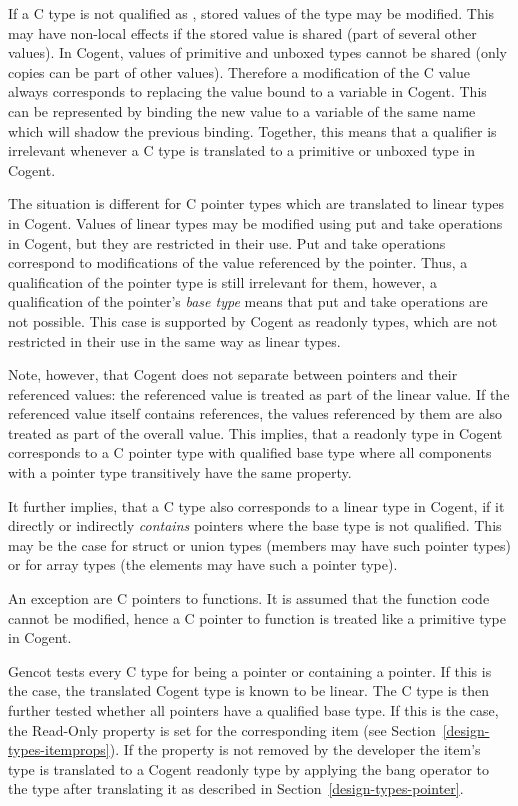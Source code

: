 If a C type is not qualified as , stored values of the type may be modified. This may have non-local
effects if the stored value is shared (part of several other values). In Cogent, values of primitive and unboxed types
cannot be shared (only copies can be part of other values). Therefore a modification of the C value always corresponds to
replacing the value bound to a variable in Cogent. This can be represented by binding the new value to a variable
of the same name which will shadow the previous binding. Together, this means that a  qualifier is
irrelevant whenever a C type is translated to a primitive or unboxed type in Cogent.

The situation is different for C pointer types which are translated to linear types in Cogent. Values of linear types
may be modified using put and take operations in Cogent, but they are restricted in their use. Put and take operations
correspond to modifications of the value referenced by the pointer. Thus, a  qualification of the pointer
type is still irrelevant for them, however, a  qualification of the pointer's \textit{base type} means
that put and take operations are not possible. This case is supported by Cogent as readonly types, which are not
restricted in their use in the same way as linear types.

Note, however, that Cogent does not separate between pointers and their referenced values: the referenced value
is treated as part of the linear value. If the referenced value itself contains references, the values referenced
by them are also treated as part of the overall value. This implies, that a readonly type in Cogent corresponds to
a C pointer type with  qualified base type where all components with a pointer type transitively have
the same property.

It further implies, that a C type also corresponds to a linear type in Cogent, if it directly or indirectly 
\textit{contains} pointers where the base type is not  qualified. This may be the case for struct or union
types (members may have such pointer types) or for array types (the elements may have such a pointer type).

An exception are C pointers to functions. It is assumed that the function code cannot be modified, hence a C pointer 
to function is treated like a primitive type in Cogent.

Gencot tests every C type for being a pointer or containing a pointer. If this is the case, the translated Cogent 
type is known to be linear. The C type is then further tested whether all pointers have a  qualified
base type. If this is the case, the Read-Only property is set for the corresponding item (see Section~\ref{design-types-itemprops}). 
If the property is not removed by the developer the item's type is translated to a Cogent readonly type
by applying the bang operator \code{!} to the type after translating it as described in Section~\ref{design-types-pointer}.

